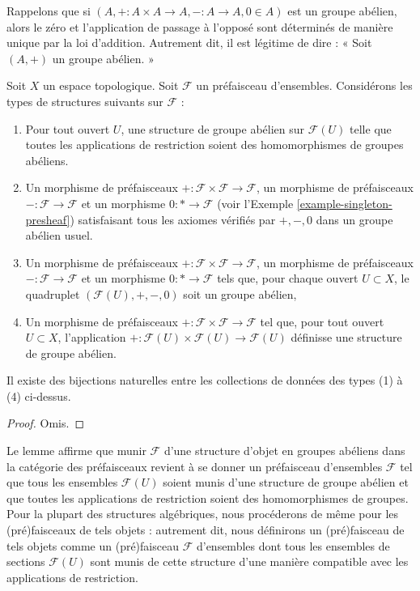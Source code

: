 \noindent
Rappelons que si $(A, + : A \times A \to A, - : A \to A, 0\in A)$
est un groupe abélien, alors le zéro et l'application de passage à l'opposé
sont déterminés de manière unique par la loi d'addition. Autrement dit, il
est légitime de dire : « Soit $(A, +)$ un groupe abélien. »

\begin{lemma}
\label{lemma-abelian-presheaves}
Soit $X$ un espace topologique.
Soit $\mathcal{F}$ un préfaisceau d'ensembles.
Considérons les types de structures suivants sur $\mathcal{F}$ :
\begin{enumerate}
\item Pour tout ouvert $U$, une structure de groupe abélien
sur $\mathcal{F}(U)$ telle que toutes les applications de restriction soient des
homomorphismes de groupes abéliens.
\item Un morphisme de préfaisceaux
$+ : \mathcal{F} \times \mathcal{F} \to \mathcal{F}$,
un morphisme de préfaisceaux $- : \mathcal{F} \to \mathcal{F}$
et un morphisme $0 : * \to \mathcal{F}$
(voir l'Exemple \ref{example-singleton-presheaf})
satisfaisant tous les axiomes vérifiés par $+, -, 0$ dans un
groupe abélien usuel.
\item Un morphisme de préfaisceaux
$+ : \mathcal{F} \times \mathcal{F} \to \mathcal{F}$,
un morphisme de préfaisceaux $- : \mathcal{F} \to \mathcal{F}$
et un morphisme $0 : * \to \mathcal{F}$
tels que, pour chaque ouvert $U \subset X$, le quadruplet
$(\mathcal{F}(U), +, -, 0)$ soit un groupe abélien,
\item Un morphisme de préfaisceaux $+ : \mathcal{F} \times \mathcal{F}
\to \mathcal{F}$ tel que, pour tout ouvert $U \subset X$,
l'application $+ : \mathcal{F}(U) \times \mathcal{F}(U) \to \mathcal{F}(U)$
définisse une structure de groupe abélien.
\end{enumerate}
Il existe des bijections naturelles entre les collections de
données des types (1) à (4) ci-dessus.
\end{lemma}

\begin{proof}
Omis.
\end{proof}

\noindent
Le lemme affirme que munir $\mathcal{F}$ d'une structure d'objet en groupes
abéliens dans la catégorie des préfaisceaux revient à se donner un préfaisceau
d'ensembles
$\mathcal{F}$ tel que tous les ensembles $\mathcal{F}(U)$ soient munis
d'une structure de groupe abélien et que toutes les applications de restriction
soient des homomorphismes de groupes. Pour la plupart des structures algébriques,
nous procéderons de même pour les (pré)faisceaux de tels objets : autrement dit,
nous définirons un (pré)faisceau de tels objets comme un (pré)faisceau
$\mathcal{F}$ d'ensembles dont tous les ensembles de sections $\mathcal{F}(U)$
sont munis de cette structure d'une manière compatible avec les applications
de restriction.

